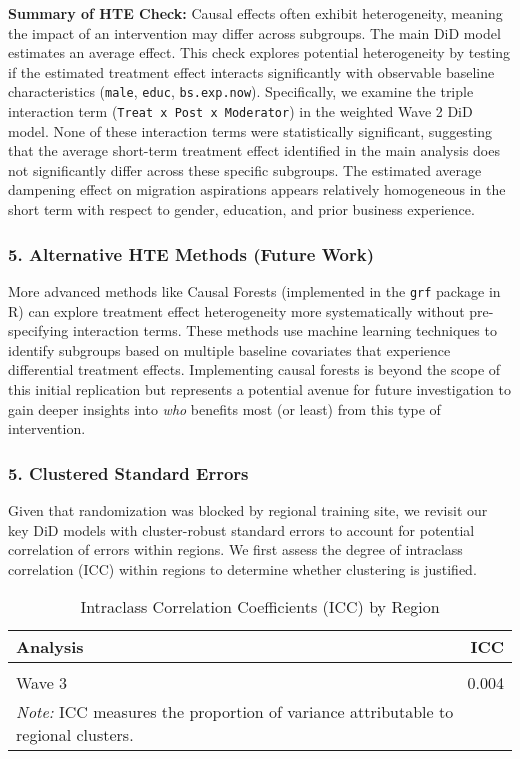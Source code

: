 \documentclass[
]{article}
\begin{document}
\textbf{Summary of HTE Check:} Causal effects often exhibit
heterogeneity, meaning the impact of an intervention may differ across
subgroups. The main DiD model estimates an average effect. This check
explores potential heterogeneity by testing if the estimated treatment
effect interacts significantly with observable baseline characteristics
(\texttt{male}, \texttt{educ}, \texttt{bs.exp.now}). Specifically, we
examine the triple interaction term
(\texttt{Treat\ x\ Post\ x\ Moderator}) in the weighted Wave 2 DiD
model. None of these interaction terms were statistically significant,
suggesting that the average short-term treatment effect identified in
the main analysis does not significantly differ across these specific
subgroups. The estimated average dampening effect on migration
aspirations appears relatively homogeneous in the short term with
respect to gender, education, and prior business experience.

\subsubsection{5. Alternative HTE Methods (Future
Work)}\label{alternative-hte-methods-future-work}

More advanced methods like Causal Forests (implemented in the
\texttt{grf} package in R) can explore treatment effect heterogeneity
more systematically without pre-specifying interaction terms. These
methods use machine learning techniques to identify subgroups based on
multiple baseline covariates that experience differential treatment
effects. Implementing causal forests is beyond the scope of this initial
replication but represents a potential avenue for future investigation
to gain deeper insights into \emph{who} benefits most (or least) from
this type of intervention.

\subsubsection{5. Clustered Standard
Errors}\label{clustered-standard-errors}

Given that randomization was blocked by regional training site, we
revisit our key DiD models with cluster-robust standard errors to
account for potential correlation of errors within regions. We first
assess the degree of intraclass correlation (ICC) within regions to
determine whether clustering is justified.

\begin{table}[H]
\centering
\caption{\label{tab:robust-cluster-icc}Intraclass Correlation Coefficients (ICC) by Region}
\centering
\fontsize{9}{11}\selectfont
\begin{tabular}[t]{lr}
\toprule
Analysis & ICC\\
\midrule
\cellcolor{gray!10}{Wave 2} & \cellcolor{gray!10}{0.009}\\
Wave 3 & 0.004\\
\bottomrule
\multicolumn{2}{l}{\rule{0pt}{1em}\textit{Note: } ICC measures the proportion of variance attributable to regional clusters.}\\
\end{tabular}
\end{table}
\end{document}
